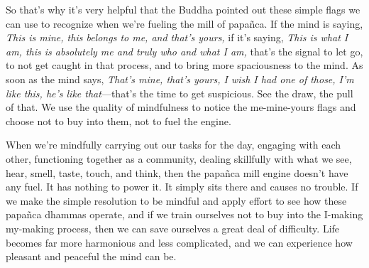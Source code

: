 So that's why it's very helpful that the Buddha pointed out these 
simple flags we can use to recognize when we're fueling the mill of 
papañca. If the mind is saying, \emph{This is mine, this belongs to 
me, and that's yours,} if it's saying, \emph{This is what I am, this is 
absolutely me and truly who and what I am,} that's the signal to let 
go, to not get caught in that process, and to bring more spaciousness 
to the mind. As soon as the mind says, \emph{That's mine, that's yours, 
I wish I had one of those, I'm like this, he's like that}---that's the 
time to get suspicious. See the draw, the pull of that. We use the 
quality of mindfulness to notice the me-mine-yours flags and choose not 
to buy into them, not to fuel the engine.

When we're mindfully carrying out our tasks for the day, engaging with 
each other, functioning together as a community, dealing skillfully 
with what we see, hear, smell, taste, touch, and think, then the 
papañca mill engine doesn't have any fuel. It has nothing to power it. 
It simply sits there and causes no trouble. If we make the simple 
resolution to be mindful and apply effort to see how these papañca 
dhammas operate, and if we train ourselves not to buy into the I-making 
my-making process, then we can save ourselves a great deal of 
difficulty. Life becomes far more harmonious and less complicated, and 
we can experience how pleasant and peaceful the mind can be.

